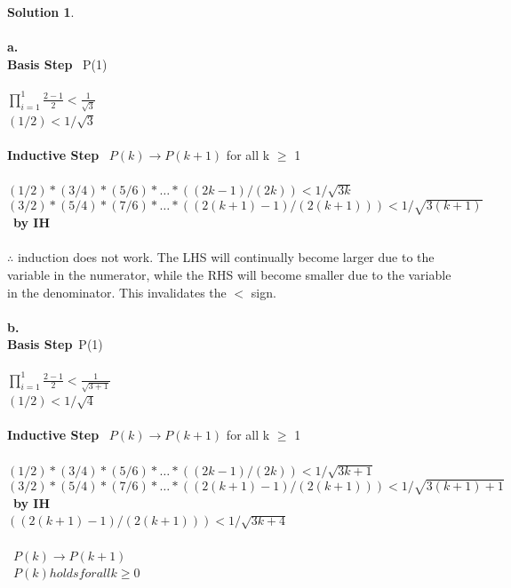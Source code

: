 \documentclass{article}
\theoremstyle{definition}
\newtheorem*{solution}{Solution}
\begin{document}
\begin{solution}\ \\
\ \\
\textbf{a.} \ \ \\
\textbf{Basis Step} \ P(1) \ \\
\ \\
$\prod_{i=1}^1 \frac{2-1}{2} < \frac{1}{\sqrt{3}}$\ \\
$(1/2) < 1/\sqrt{3}$ \checkmark \ \\
\ \\
\textbf{Inductive Step} \ $P(k) \xrightarrow{} P(k+1)$ for all k $\geq$ 1 \ \\
\ \\
$(1/2)*(3/4)*(5/6)*\dots*((2k-1)/(2k)) < 1/\sqrt{3k}$\ \\
$(3/2)*(5/4)*(7/6)*\dots*((2(k+1)-1)/(2(k+1))) < 1/\sqrt{3(k+1)}$\ \textbf{by IH} \\
\ \\
$\therefore $ induction does not work. The LHS will continually become larger due to the variable in the numerator, while the RHS will become smaller due to the variable in the denominator. This invalidates the $<$ sign.\ \\
\ \\
\textbf{b.} \ \\
\textbf{Basis Step}\ P(1) \ \\
\ \\
$\prod_{i=1}^1 \frac{2-1}{2} < \frac{1}{\sqrt{3+1}}$\ \\
$(1/2) < 1/\sqrt{4}$ \checkmark \ \\
\ \\
\textbf{Inductive Step} \ $P(k) \xrightarrow{} P(k+1)$ for all k $\geq$ 1\ \\
\ \\
$(1/2)*(3/4)*(5/6)*\dots*((2k-1)/(2k)) < 1/\sqrt{3k + 1}$\ \\
$(3/2)*(5/4)*(7/6)*\dots*((2(k+1)-1)/(2(k+1))) < 1/\sqrt{3(k+1)+1}$\ \textbf{by IH} \\
$((2(k+1)-1)/(2(k+1))) < 1/\sqrt{3k+4}$ \ \checkmark \ \\
\ \\  
\therefore \ $P(k) \xrightarrow{} P(k+1)$\ \\
\therefore \ $P(k) holds for all k \geq 0$\ \\
\ \\

\end{solution}
\end{document}
